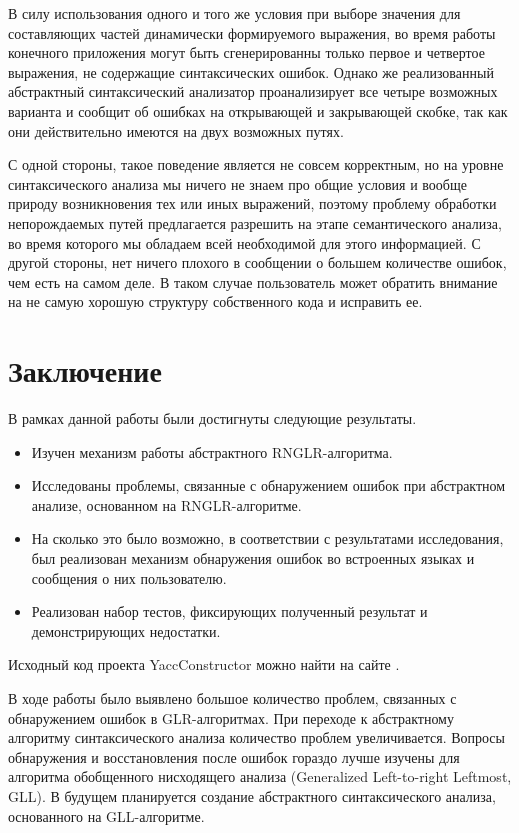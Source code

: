 В силу использования одного и того же условия при выборе значения для составляющих 
частей динамически формируемого выражения, во время работы конечного приложения 
могут быть сгенерированны только первое и четвертое выражения, не содержащие 
синтаксических ошибок. Однако же реализованный абстрактный синтаксический анализатор 
проанализирует все четыре возможных варианта и сообщит об ошибках на открывающей 
и закрывающей скобке, так как они действительно имеются на двух возможных путях. 

С одной стороны, такое поведение является не совсем корректным, но на уровне 
синтаксического анализа мы ничего не знаем про общие условия и вообще природу 
возникновения тех или иных выражений, поэтому проблему обработки непорождаемых 
путей предлагается разрешить на этапе семантического анализа, во время которого 
мы обладаем всей необходимой для этого информацией. С другой стороны, нет ничего 
плохого в сообщении о большем количестве ошибок, чем есть на самом деле. В таком 
случае пользователь может обратить внимание на не самую хорошую структуру 
собственного кода и исправить ее.

\section*{Заключение}
В рамках данной работы были достигнуты следующие результаты.
\begin{itemize}
    \item Изучен механизм работы абстрактного RNGLR-алгоритма.
    \item Исследованы проблемы, связанные с обнаружением ошибок при абстрактном 
    анализе, основанном на RNGLR-алгоритме.
    \item На сколько это было возможно, в соответствии с результатами исследования, 
    был реализован механизм обнаружения ошибок во встроенных языках и сообщения о 
    них пользователю.
    \item Реализован набор тестов, фиксирующих полученный результат и демонстрирующих 
    недостатки.
\end{itemize}

Исходный код проекта YaccConstructor можно найти на сайте . 

В ходе работы было выявлено большое количество проблем, связанных с обнаружением 
ошибок в GLR-алгоритмах. При переходе к абстрактному алгоритму синтаксического 
анализа количество проблем увеличивается. Вопросы обнаружения и восстановления 
после ошибок гораздо лучше изучены для алгоритма обобщенного нисходящего анализа 
(Generalized Left-to-right Leftmost, GLL). В будущем планируется создание абстрактного 
синтаксического анализа, основанного на GLL-алгоритме. 

